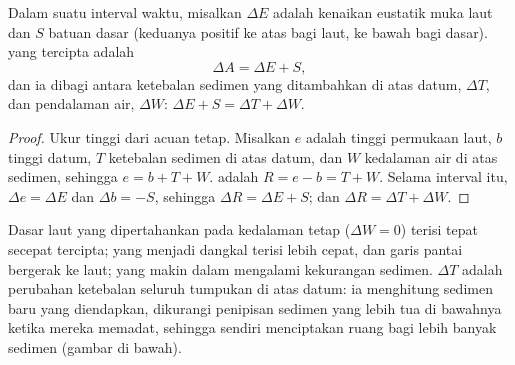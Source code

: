 \begin{proposition}\label{prop:b1:diagenesis-basins:budget}
Dalam suatu interval waktu, misalkan $\Delta E$ adalah kenaikan eustatik muka laut dan $S$  batuan dasar (keduanya positif ke atas bagi laut, ke bawah bagi dasar).  yang tercipta adalah
\[
  \Delta A = \Delta E + S ,
\]
dan ia dibagi antara ketebalan sedimen yang ditambahkan di atas datum, $\Delta T$, dan pendalaman air, $\Delta W$: $\Delta E + S = \Delta T + \Delta W$.
\end{proposition}

\begin{proof}
Ukur tinggi dari acuan tetap. Misalkan $e$ adalah tinggi permukaan laut, $b$ tinggi datum, $T$ ketebalan sedimen di atas datum, dan $W$ kedalaman air di atas sedimen, sehingga $e = b + T + W$.  adalah $R = e - b = T + W$. Selama interval itu, $\Delta e =
\Delta E$ dan $\Delta b = -S$, sehingga $\Delta R = \Delta E + S$; dan $\Delta R =
\Delta T + \Delta W$.
\end{proof}

Dasar laut yang dipertahankan pada kedalaman tetap ($\Delta W = 0$) terisi tepat secepat  tercipta; yang menjadi dangkal terisi lebih cepat, dan garis pantai bergerak ke laut; yang makin dalam mengalami kekurangan sedimen. $\Delta T$ adalah perubahan ketebalan seluruh tumpukan di atas datum: ia menghitung sedimen baru yang diendapkan, dikurangi penipisan sedimen yang lebih tua di bawahnya ketika mereka memadat, sehingga  sendiri menciptakan ruang bagi lebih banyak sedimen (gambar di bawah).

